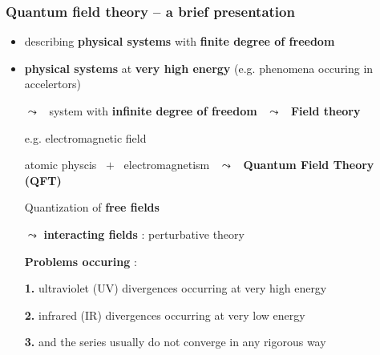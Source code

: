 \documentclass[9pt]{beamer}
\begin{document}
\begin{frame}
 
\frametitle{Quantum field theory -- a brief presentation}

\begin{itemize}

\item describing \textbf{physical systems} with \textbf{finite degree of freedom} \ \checkmark

\item \textbf{physical systems} at \textbf{very high energy} (e.g. phenomena occuring in accelertors)\par

$\leadsto$ \ system with \textbf{infinite degree of freedom} \ $\leadsto$ \ \textbf{Field theory}\par

e.g. electromagnetic field\par

atomic physcis \ $+$ \ electromagnetism \ $\leadsto$ \ \textbf{Quantum Field Theory (QFT)}\par

\quad Quantization of \textbf{free fields} \ \checkmark\par

\vspace*{-12pt}
\begin{block}{\vspace*{-3ex}}
\vspace*{-5pt}\hspace*{12pt}%
$\leadsto$ \textbf{interacting fields} : perturbative theory\par
\end{block}
\vspace*{-5pt}

\textbf{Problems occuring} : \par

\vspace*{-12pt}
\begin{block}{\vspace*{-3ex}}
\vspace*{-5pt}\hspace*{12pt}%
\textbf{1.} ultraviolet (UV) divergences occurring at very high energy
\end{block}
\vspace*{-5pt}
\textbf{2.} infrared (IR) divergences occurring at very low energy

\textbf{3.} and the series usually do not converge in any rigorous way

\end{itemize}

\end{frame}
\end{document}
